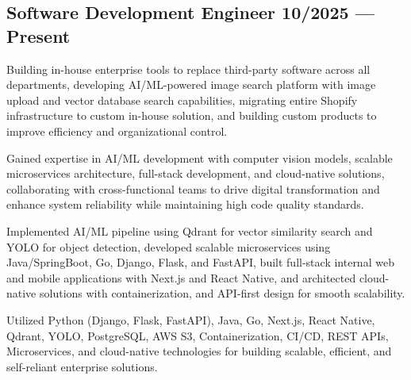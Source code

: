 \subsection{{Software Development Engineer \hfill 10/2025 --- Present}}
\begin{zitemize}
    \item Building in-house enterprise tools to replace third-party software across all departments, developing AI/ML-powered image search platform with image upload and vector database search capabilities, migrating entire Shopify infrastructure to custom in-house solution, and building custom products to improve efficiency and organizational control.
    \item Gained expertise in AI/ML development with computer vision models, scalable microservices architecture, full-stack development, and cloud-native solutions, collaborating with cross-functional teams to drive digital transformation and enhance system reliability while maintaining high code quality standards.
    \item Implemented AI/ML pipeline using Qdrant for vector similarity search and YOLO for object detection, developed scalable microservices using Java/SpringBoot, Go, Django, Flask, and FastAPI, built full-stack internal web and mobile applications with Next.js and React Native, and architected cloud-native solutions with containerization, and API-first design for smooth scalability.
    \item Utilized Python (Django, Flask, FastAPI), Java, Go, Next.js, React Native, Qdrant, YOLO, PostgreSQL, AWS S3, Containerization, CI/CD, REST APIs, Microservices, and cloud-native technologies for building scalable, efficient, and self-reliant enterprise solutions.
\end{zitemize}

